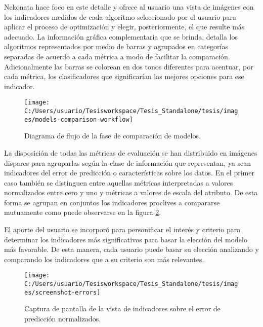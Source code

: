 Nekonata hace foco en este detalle y ofrece al usuario una vista de
imágenes con los indicadores medidos de cada algoritmo seleccionado
por el usuario para aplicar el proceso de optimización y elegir, posteriormente,
el que resulte más adecuado. La información gráfica complementaria
que se brinda, detalla los algoritmos representados por medio de barras
y agrupados en categorías separadas de acuerdo a cada métrica a modo
de facilitar la comparación. Adicionalmente las barras se colorean
en dos tonos diferentes para acentuar, por cada métrica, los clasificadores
que significarían las mejores opciones para ese indicador. 

\begin{figure}
\begin{centering}
\texttt{[image: C:/Users/usuario/Tesisworkspace/Tesis\_Standalone/tesis/images/models-comparison-workflow]}
\par\end{centering}

\caption{Diagrama de flujo de la fase de comparación de modelos. \label{fig:models-comparison-workflow}}
\end{figure}


La disposición de todas las métricas de evaluación se han distribuido
en imágenes dispares para agruparlas según la clase de información
que representan, ya sean indicadores del error de predicción o características
sobre los datos. En el primer caso también se distinguen entre aquellas
métricas interpretadas a valores normalizados entre cero y uno y métricas
a valores de escala del atributo. De esta forma se agrupan en conjuntos
los indicadores proclives a compararse mutuamente como puede observarse
en la figura \ref{fig:screenshot-errors}. 

El aporte del usuario se incorporó para personificar el interés y
criterio para determinar los indicadores más significativos para basar
la elección del modelo más favorable. De esta manera, cada usuario
puede basar su elección analizando y comparando los indicadores que
a su criterio son más relevantes. 

\begin{figure}
\begin{centering}
\texttt{[image: C:/Users/usuario/Tesisworkspace/Tesis\_Standalone/tesis/images/screenshot-errors]}
\par\end{centering}

\caption{Captura de pantalla de la vista de indicadores sobre el error de predicción
normalizados.\label{fig:screenshot-errors}}
\end{figure}



